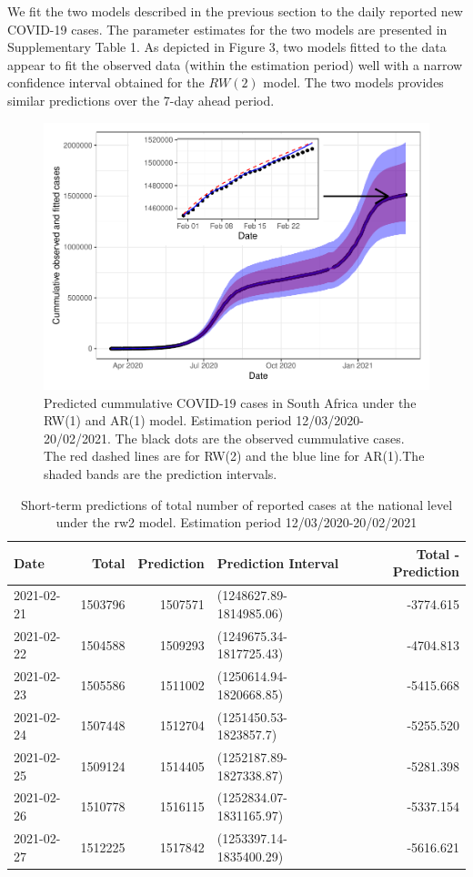 \documentclass[10pt,letterpaper]{article}
\begin{document}
We fit the two models described in the previous section to the daily
reported new COVID-19 cases. The parameter estimates for the two models
are presented in Supplementary Table 1. As depicted in Figure 3, two
models fitted to the data appear to fit the observed data (within the
estimation period) well with a narrow confidence interval obtained for
the \(RW(2)\) model. The two models provides similar predictions over
the 7-day ahead period.

\begin{figure}[H]
\includegraphics[width=0.99\linewidth]{COVIDincidenceSA_files/figure-latex/predd-1} \caption{Predicted cummulative COVID-19 cases in South Africa under the RW(1) and AR(1) model. Estimation period 12/03/2020-20/02/2021. The black dots are the observed cummulative cases. The red dashed lines are for RW(2) and the blue line for AR(1).The shaded bands are the prediction intervals. }\label{fig:predd}
\end{figure}

\begin{table}[!h]

\caption{\label{tab:unnamed-chunk-10}Short-term predictions of total number of reported cases at the national level under the rw2 model. Estimation period 12/03/2020-20/02/2021}
\centering
\begin{tabular}[t]{l|r|r|l|r}
\hline
Date & Total & Prediction & Prediction Interval & Total - Prediction\\
\hline
2021-02-21 & 1503796 & 1507571 & (1248627.89-1814985.06) & -3774.615\\
\hline
2021-02-22 & 1504588 & 1509293 & (1249675.34-1817725.43) & -4704.813\\
\hline
2021-02-23 & 1505586 & 1511002 & (1250614.94-1820668.85) & -5415.668\\
\hline
2021-02-24 & 1507448 & 1512704 & (1251450.53-1823857.7) & -5255.520\\
\hline
2021-02-25 & 1509124 & 1514405 & (1252187.89-1827338.87) & -5281.398\\
\hline
2021-02-26 & 1510778 & 1516115 & (1252834.07-1831165.97) & -5337.154\\
\hline
2021-02-27 & 1512225 & 1517842 & (1253397.14-1835400.29) & -5616.621\\
\hline
\end{tabular}
\end{table}
\end{document}
